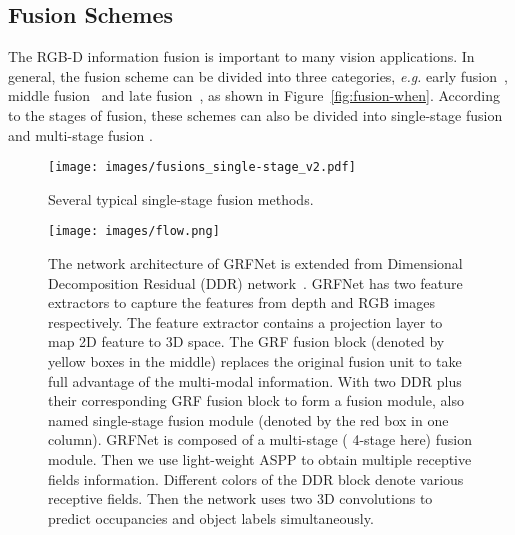 \documentclass[10pt,twocolumn,letterpaper]{article}
\begin{document}
\subsection{Fusion Schemes}
\vspace{-0.1cm}
The RGB-D information fusion is important to many vision applications.
In general, the fusion scheme can be divided into three categories, \textit{e.g.} early fusion~\cite{couprie2013indoor}, middle fusion~\cite{ren2012rgb} and late fusion~\cite{yue2015beyond,simonyan2014two}, as shown in Figure~\ref{fig:fusion-when}.
According to the stages of fusion, these schemes can also be divided into single-stage fusion and multi-stage fusion \cite{hazirbas2016fusenet,park2017rdfnet}.



\begin{figure}[t]
\begin{center}   
{
\texttt{[image: images/fusions\_single-stage\_v2.pdf]}
}
\caption{Several typical single-stage fusion methods. }
\vspace{-0.5cm}
\label{fig:fusion-single-stage}
\end{center}
\end{figure}


\begin{figure*}[t]
\begin{center}
{
\texttt{[image: images/flow.png]}
}
\caption{The network architecture of GRFNet is extended from Dimensional Decomposition Residual (DDR) network~\cite{li2019rgbd}. 
GRFNet has two feature extractors to capture the features from depth and RGB images respectively.
The feature extractor contains a projection layer to map 2D feature to 3D space.
The GRF fusion block (denoted by yellow boxes in the middle) replaces the original fusion unit to take full advantage of the multi-modal information. With two DDR plus their corresponding GRF fusion block to form a fusion module, also named single-stage fusion module (denoted by the red box in one column). GRFNet is composed of a multi-stage ( 4-stage here) fusion module. Then we use light-weight ASPP to obtain multiple receptive fields information.
Different colors of the DDR block denote various receptive fields.
Then the network uses two 3D convolutions to predict occupancies and object labels simultaneously.
}
\label{fig:network_structure}
\end{center}
\end{figure*}
\end{document}
